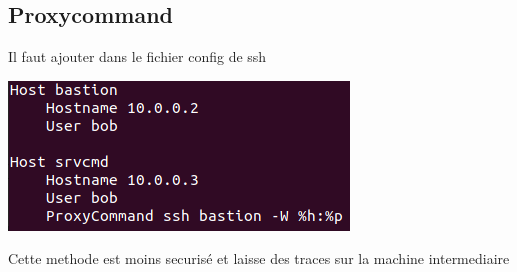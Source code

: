 \documentclass{article}
\begin{document}
 \subsection{\large{Proxycommand}}
  
  Il faut ajouter dans le fichier config de ssh
  
 \begin{center}
        \includegraphics[scale=0.5]{Images/proxycommand.png}
 \end{center}
 
 Cette methode est moins securisé et laisse des traces sur la machine intermediaire 
  
 
 \newpage
 
 
 
\end{document}
